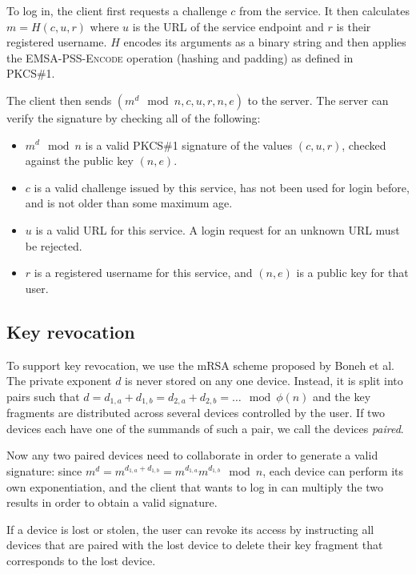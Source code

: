 \documentclass{article}
\begin{document}
To log in, the client first requests a challenge $c$ from the service. It then calculates
$m = H(c, u, r)$ where $u$ is the URL of the service endpoint and $r$ is their registered username.
$H$ encodes its arguments as a binary string and then applies the \textsc{EMSA-PSS-Encode} operation
(hashing and padding) as defined in PKCS\#1.~\cite{PKCS1}

The client then sends $(m^d \mod n, c, u, r, n, e)$ to the server. The server can verify the
signature by checking all of the following:

\begin{itemize}
\item $m^d \mod n$ is a valid PKCS\#1 signature of the values $(c, u, r)$, checked against the
public key $(n, e)$.
\item $c$ is a valid challenge issued by this service, has not been used for login before, and is
not older than some maximum age.
\item $u$ is a valid URL for this service. A login request for an unknown URL must be rejected.
\item $r$ is a registered username for this service, and $(n, e)$ is a public key for that user.
\end{itemize}

\subsection{Key revocation}

To support key revocation, we use the mRSA scheme proposed by Boneh et al.~\cite{Boneh01} The
private exponent $d$ is never stored on any one device. Instead, it is split into pairs such that
$d = d_{1,a} + d_{1,b} = d_{2,a} + d_{2,b} = \dots \mod \phi(n)$ and the key fragments are
distributed across several devices controlled by the user. If two devices each have one of the
summands of such a pair, we call the devices \emph{paired}.

Now any two paired devices need to collaborate in order to generate a valid signature: since
$m^d = m^{d_{1,a} + d_{1,b}} = m^{d_{1,a}} m^{d_{1,b}} \mod n$, each device can perform its own
exponentiation, and the client that wants to log in can multiply the two results in order to obtain
a valid signature.

If a device is lost or stolen, the user can revoke its access by instructing all devices that are
paired with the lost device to delete their key fragment that corresponds to the lost device.
\end{document}
